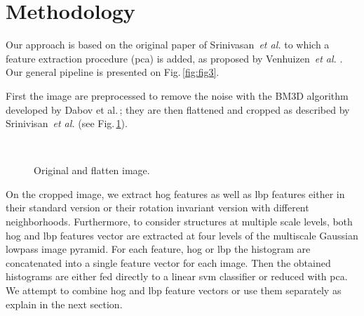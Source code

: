 \graphicspath{ {./content/method/figures/} }

\section{Methodology}\label{sec:method}

Our approach is based on the original paper of Srinivasan~\textit{et al.} \cite{srinivasan2014fully} to which a feature extraction procedure (\gls{pca}) is added, as proposed by Venhuizen~\textit{et al.} \cite{venhuizen2015automated}.
Our general pipeline is presented on Fig.\,\ref{fig:fig3}.

First the image are preprocessed to remove the noise with the BM3D algorithm developed by Dabov et al.\,\cite{dabov2007image}; they are then flattened and cropped as described by Srinivisan~\textit{et al.} \cite{srinivasan2014fully} (see Fig.\,\ref{fig:fig4}).
\begin{figure}
\centering
{}\
\caption{Original and flatten image.}
\label{fig:fig4}
\end{figure}
On the cropped image, we extract \gls{hog} features \cite{dalal2005histograms} as well as \gls{lbp} features either in their standard version \cite{ojala2002multiresolution} or their rotation invariant version \cite{zhao2012rotation} with different neighborhoods.
Furthermore, to consider structures at multiple scale levels, both \gls{hog} and \gls{lbp} features vector are extracted at four levels of the multiscale Gaussian lowpass image pyramid.
For each feature, \gls{hog} or \gls{lbp} the histogram are concatenated into a single feature vector for each image.
Then the obtained histograms are either fed directly to a linear \gls{svm} classifier or reduced with \gls{pca}. 
We attempt to combine \gls{hog} and \gls{lbp} feature vectors or use them separately as explain in the next section.
